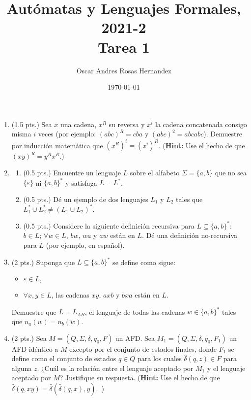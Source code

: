 \documentclass[letterpaper,12pt]{article}
\title{Autómatas y Lenguajes Formales, 2021-2 \\ Tarea 1}
\author{Oscar Andres Rosas Hernandez}
\date{\today}
\begin{document}
\maketitle

	
\begin{enumerate}
\item (1.5 pts.) Sea $x$ una cadena, $x^R$ su reversa y $x^i$ la cadena concatenada consigo misma $i$ veces (por ejemplo: $(abc)^R = cba$ y $(abc)^2=abcabc$). Demuestre por inducción matemática que $(x^R)^i=(x^i)^R$. ({\bf Hint:} Use el hecho de que $(xy)^R=y^Rx^R$.)

\item 
\begin{enumerate}
\item (0.5 pts.) Encuentre un lenguaje $L$ sobre el alfabeto $\Sigma = \{a,b\}$ que no sea $\{\varepsilon\}$ ni $\{a,b\}^*$ y satisfaga $L=L^*$.
\item (0.5 pts.) Dé un ejemplo de dos lenguajes $L_1$ y $L_2$ tales que $L_1^*\cup L_2^* \neq (L_1\cup L_2)^*$.
\item (0.5 pts.) Considere la siguiente definición recursiva para $L\subseteq\{a,b\}^*$: $b\in L$; $\forall w\in L$, $bw$, $wa$ y $aw$ están en $L$. Dé una definición no-recursiva para $L$ (por ejemplo, en español).
\end{enumerate}


\item (2 pts.) Suponga que $L\subseteq \{a,b\}^*$ se define como sigue:
   \begin{itemize}
   \item $\varepsilon \in L$,
   \item $\forall x,y\in L$, las cadenas $xy$, $axb$ y $bxa$  están en $L$.
   \end{itemize}
Demuestre que $L=L_{AB}$, el lenguaje de todas las cadenas $w\in\{a,b\}^*$ tales que $n_a(w)=n_b(w)$.

\item (2 pts.) Sea $M=(Q,\Sigma,\delta,q_0,F)$ un AFD. Sea $M_1=(Q,\Sigma,\delta,q_0,F_1)$ 
un AFD idéntico a $M$ excepto por el conjunto de estados finales, 
donde $F_1$ se define como el conjunto de estados 
$q\in Q$ para los cuales $\widehat{\delta}(q,z)\in F$ para alguna $z$. ¿Cuál es la relación entre el lenguaje aceptado por $M_1$ y el
 lenguaje aceptado por $M$? Justifique su respuesta. ({\bf Hint:} Use 
 el hecho de que $\widehat{\delta}(q, xy) = \widehat{\delta}(\widehat{\delta}(q, x), y)
$.\ )


\end{enumerate}
\end{document}
